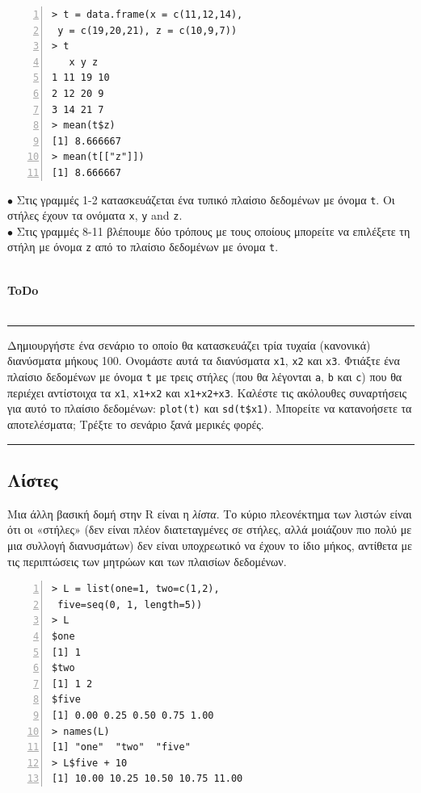 \documentclass[a4paper,10pt,twocolumn]{article}
\newenvironment{ToDo} {
  \begin{flushright}
    \hfill
    \begin{minipage}{0.9\columnwidth}
    \textsf{\textbf{ToDo}} \\
      \vspace{-0.7cm}\\
      {\color{Gray}\rule[-0.05cm]{\columnwidth}{1.5pt}}} {
      {\color{Gray}\rule[0.3cm]{\columnwidth}{1.5pt}}
    \end{minipage}
    \vspace{0.3cm}
  \end{flushright}
  }
\begin{document}
\begin{Verbatim}[frame=single,numbers=left,gobble=0, xleftmargin=0.35cm, numbersep=0.1cm]
> t = data.frame(x = c(11,12,14),
 y = c(19,20,21), z = c(10,9,7))
> t
   x y z
1 11 19 10
2 12 20 9 
3 14 21 7  
> mean(t$z)
[1] 8.666667
> mean(t[["z"]])
[1] 8.666667
\end{Verbatim}

\noindent $\bullet$ Στις γραμμές 1-2 κατασκευάζεται ένα τυπικό πλαίσιο δεδομένων με όνομα \texttt{t}. Οι στήλες
έχουν τα ονόματα \texttt{x}, \texttt{y} and \texttt{z}.\\
\noindent $\bullet$ Στις γραμμές 8-11 βλέπουμε δύο τρόπους με τους οποίους μπορείτε να επιλέξετε τη στήλη με 
όνομα \texttt{z} από το πλαίσιο δεδομένων με όνομα \texttt{t}.\\
\\

\begin{ToDo}
Δημιουργήστε ένα σενάριο το οποίο θα κατασκευάζει τρία τυχαία (κανονικά) διανύσματα μήκους 100. Ονομάστε
αυτά τα διανύσματα \texttt{x1}, \texttt{x2} και \texttt{x3}. Φτιάξτε ένα πλαίσιο δεδομένων με όνομα \texttt{t}
με τρεις στήλες (που θα λέγονται \texttt{a}, \texttt{b} και \texttt{c}) που θα περιέχει αντίστοιχα τα 
\texttt{x1}, \texttt{x1+x2} και \texttt{x1+x2+x3}. Καλέστε τις ακόλουθες συναρτήσεις για αυτό το πλαίσιο
δεδομένων: \texttt{plot(t)} και \texttt{sd(t\$x1)}. Μπορείτε να κατανοήσετε τα αποτελέσματα; Τρέξτε το
σενάριο ξανά μερικές φορές.\\
\end{ToDo}

\subsection{Λίστες}

Μια άλλη βασική δομή στην R είναι η \emph{λίστα}. Το κύριο πλεονέκτημα των λιστών είναι ότι οι «στήλες»
(δεν είναι πλέον διατεταγμένες σε στήλες, αλλά μοιάζουν πιο πολύ με μια συλλογή διανυσμάτων) δεν είναι
υποχρεωτικό να έχουν το ίδιο μήκος, αντίθετα με τις περιπτώσεις των μητρώων και των πλαισίων δεδομένων.

\begin{Verbatim}[frame=single,numbers=left,gobble=0, xleftmargin=0.35cm, numbersep=0.1cm]
> L = list(one=1, two=c(1,2), 
 five=seq(0, 1, length=5))
> L
$one
[1] 1
$two
[1] 1 2
$five
[1] 0.00 0.25 0.50 0.75 1.00
> names(L)
[1] "one"  "two"  "five"
> L$five + 10
[1] 10.00 10.25 10.50 10.75 11.00
\end{Verbatim}
\end{document}
